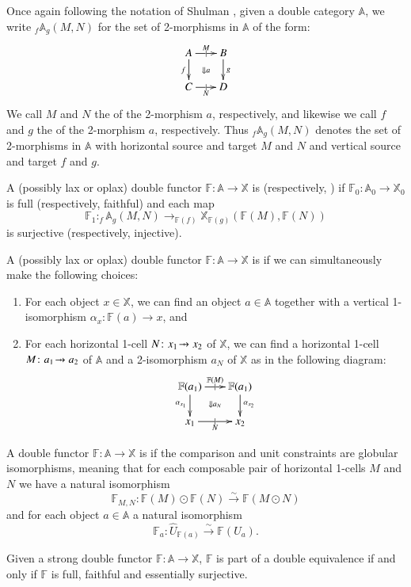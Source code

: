\documentclass{amsart}
\begin{document}
Once again following the notation of Shulman \cite{Shul2}, given a double category $\mathbb{A}$, we write $_f \mathbb{A}_g(M,N)$ for the set of 2-morphisms in $\mathbb{A}$ of the form:
\[
  \xymatrix@-.5pc{
    A \ar[r]|{|}^{M}  \ar[d]_f \ar@{}[dr]|{\Downarrow a}&
    B\ar[d]^g\\
    C \ar[r]|{|}_N & D
  }
\]
We call $M$ and $N$ the  of the 2-morphism $a$, respectively, and likewise we call $f$ and $g$ the  of the 2-morphism $a$, respectively. Thus $_f \mathbb{A}_g(M,N)$ denotes the set of 2-morphisms in $\mathbb{A}$ with horizontal source and target $M$ and $N$ and vertical source and target $f$ and $g$.
\begin{defn}
A (possibly lax or oplax) double functor $\mathbb{F} \colon \mathbb{A} \to \mathbb{X}$ is  (respectively, ) if $\mathbb{F}_0 \colon \mathbb{A}_0 \to \mathbb{X}_0$ is full (respectively, faithful) and each map $$\mathbb{F}_1 \colon _f \mathbb{A}_g(M,N) \to _{\mathbb{F}(f)} \mathbb{X}_{\mathbb{F}(g)}(\mathbb{F}(M),\mathbb{F}(N))$$ is surjective (respectively, injective).
\end{defn}
\begin{defn}
A (possibly lax or oplax) double functor $\mathbb{F} \colon \mathbb{A} \to \mathbb{X}$ is  if we can simultaneously make the following choices:
\begin{enumerate}
\item{For each object $x \in \mathbb{X}$, we can find an object $a \in \mathbb{A}$ together with a vertical 1-isomorphism $\alpha_x \colon \mathbb{F}(a) \to x$, and}
\item{For each horizontal 1-cell $N \colon x_1 \tobar x_2$  of $\mathbb{X}$, we can find a horizontal 1-cell $M \colon a_1 \tobar a_2$ of $\mathbb{A}$ and a 2-isomorphism $a_{N}$ of $\mathbb{X}$ as in the following diagram:
\[
  \xymatrix@-.5pc{
    \mathbb{F}(a_1) \ar[r]|{|}^{\mathbb{F}(M)}  \ar[d]_{\alpha_{x_1}} \ar@{}[dr]|{\Downarrow a_N}&
    \mathbb{F}(a_1) \ar[d]^{\alpha_{x_2}}\\
    x_1 \ar[r]|{|}_N & x_2
  }
\]
}
\end{enumerate}
\end{defn}
\begin{defn}
A double functor $\mathbb{F} \colon \mathbb{A} \to \mathbb{X}$ is  if the comparison and unit constraints are globular isomorphisms, meaning that for each composable pair of horizontal 1-cells $M$ and $N$ we have a natural isomorphism $$\mathbb{F}_{M,N} \colon \mathbb{F}(M) \odot \mathbb{F}(N) \xrightarrow{\sim} \mathbb{F}(M \odot N)$$and for each object $a \in \mathbb{A}$ a natural isomorphism $$\mathbb{F}_a \colon \hat{U}_{\mathbb{F}(a)} \xrightarrow{\sim} \mathbb{F}(U_a).$$
\end{defn}
\begin{thm}[Shulman,7.8]\label{ShulDubEquiv}
Given a strong double functor $\mathbb{F} \colon \mathbb{A} \to \mathbb{X}$, $\mathbb{F}$ is part of a double equivalence if and only if $\mathbb{F}$ is full, faithful and essentially surjective.
\end{thm}
\end{document}
